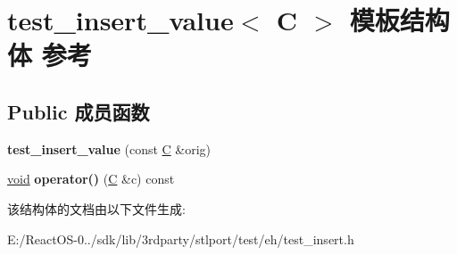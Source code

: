 \hypertarget{structtest__insert__value}{}\section{test\+\_\+insert\+\_\+value$<$ C $>$ 模板结构体 参考}
\label{structtest__insert__value}
\subsection*{Public 成员函数}
\begin{DoxyCompactItemize}
\item 
\mbox{\label{structtest__insert__value_ae7a691d68b766f5d04b3d4f78b072e35}} 
{\bfseries test\+\_\+insert\+\_\+value} (const \hyperlink{struct_c}{C} \&orig)
\item 
\mbox{\label{structtest__insert__value_a80944844db510e9760177b80d2c9f57a}} 
\hyperlink{interfacevoid}{void} {\bfseries operator()} (\hyperlink{struct_c}{C} \&c) const
\end{DoxyCompactItemize}


该结构体的文档由以下文件生成\+:\begin{DoxyCompactItemize}
\item 
E\+:/\+React\+O\+S-\/0../sdk/lib/3rdparty/stlport/test/eh/test\+\_\+insert.\+h\end{DoxyCompactItemize}
